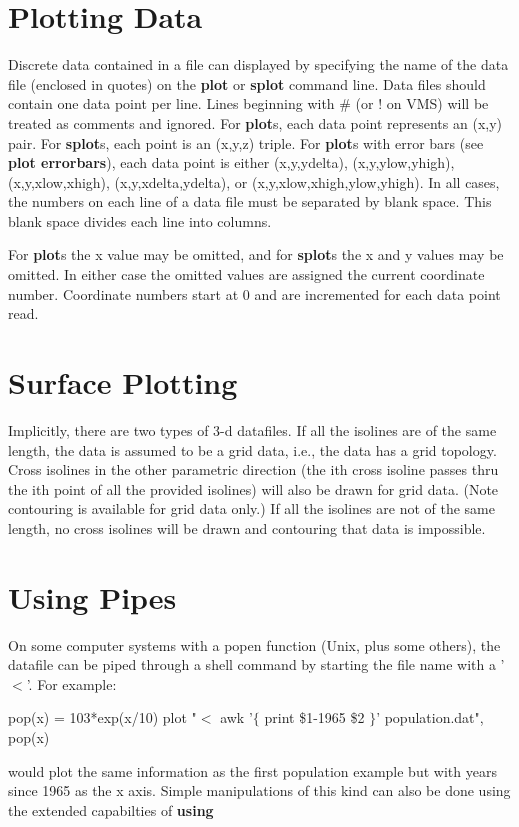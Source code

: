 \section{Plotting Data}
Discrete data contained in a file can displayed by specifying the
name of the data file (enclosed in quotes) on the {\bf plot} or {\bf splot}
command line. Data files should contain one data point per line.
Lines beginning with \# (or ! on VMS) will be treated as comments
and ignored. For {\bf plot}s, each data point represents an (x,y)
pair. For {\bf splot}s, each point is an (x,y,z) triple. For {\bf plot}s with
error bars (see {\bf plot errorbars}), each data point is either
(x,y,ydelta), (x,y,ylow,yhigh), (x,y,xlow,xhigh), (x,y,xdelta,ydelta), or
(x,y,xlow,xhigh,ylow,yhigh). In all cases, the numbers on each
line of a data file must be separated by blank space. This blank
space divides each line into columns.

For {\bf plot}s the x value may be omitted, and for {\bf splot}s the x
and y values may be omitted. In either case the omitted values are
assigned the current coordinate number. Coordinate numbers start at 0
and are incremented for each data point read.

\section{Surface Plotting}
Implicitly, there are two types of 3-d datafiles. If all the isolines
are of the same length, the data is assumed to be a grid data, i.e.,
the data has a grid topology. Cross isolines in the other parametric
direction (the ith cross isoline passes thru the ith point of all the
provided isolines) will also be drawn for grid data. (Note contouring
is available for grid data only.) If all the isolines are not of the
same length, no cross isolines will be drawn and contouring that data
is impossible.

\section{Using Pipes}

On some computer systems with a popen function (Unix, plus some
others), the datafile can be piped through a shell command by starting
the file name with a '$<$'.  For example:

        pop(x) = 103*exp(x/10)
        plot "$<$ awk '$\{$ print \$1-1965 \$2 $\}$' population.dat", pop(x)

would plot the same information as the first population example
but with years since 1965 as the x axis.  Simple manipulations
of this kind can also be done using the extended capabilties of {\bf using}

